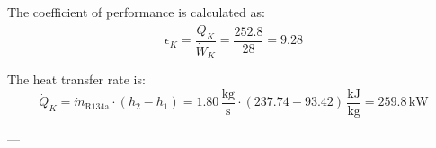 The coefficient of performance is calculated as:  
\[
\epsilon_K = \frac{\dot{Q}_K}{\dot{W}_K} = \frac{252.8}{28} = 9.28
\]  

The heat transfer rate is:  
\[
\dot{Q}_K = \dot{m}_{\text{R134a}} \cdot (h_2 - h_1) = 1.80 \, \frac{\text{kg}}{\text{s}} \cdot (237.74 - 93.42) \, \frac{\text{kJ}}{\text{kg}} = 259.8 \, \text{kW}
\]  

---